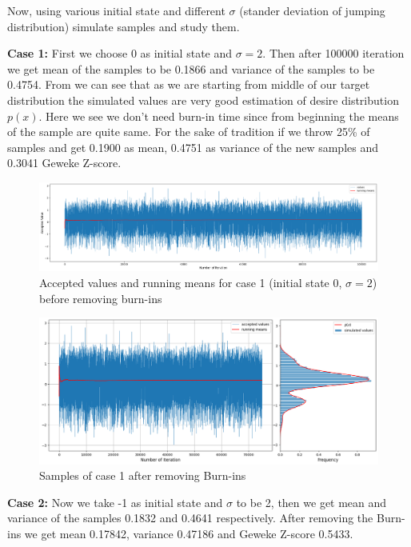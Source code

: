 \begin{example}
	Now, using various initial state and different $ \sigma $ (stander deviation of jumping distribution) simulate samples and study them.

	\textbf{Case 1:} First we choose $ 0 $ as initial state and $ \sigma = 2 $. Then after 100000 iteration we get mean of the samples to be 0.1866 and variance of the samples to be 0.4754.
	From  we can see that as we are starting from middle of our target distribution the simulated values are very good estimation of desire distribution $ p(x) $. Here we see we don't need burn-in time since from beginning the means of the sample are quite same. For the sake of tradition if we throw 25\% of samples and get 0.1900 as mean, 0.4751 as variance of the new samples and 0.3041 Geweke Z-score.

	\begin{figure}[H]
		\centering
		\includegraphics[width=1\textwidth]{./images/metropolis/example1/sample-1-values.png}
		\caption{Accepted values and running means for case 1 (initial state 0, $ \sigma = 2 $) before removing burn-ins}
		\label{fig:MH sample 1 values}
	\end{figure}

	\begin{figure}[H]
		\centering
		\includegraphics[width=1\textwidth]{./images/metropolis/example1/sample-1-value-hist-bo.png}
		\caption{Samples of case 1 after removing Burn-ins}
		\label{fig:MH sample 1 after burn-in}
	\end{figure}

	\textbf{Case 2:}  Now we take -1 as initial state and $ \sigma $ to be 2, then we get mean and variance of the samples 0.1832 and 0.4641 respectively. After removing the Burn-ins we get mean 0.17842, variance 0.47186 and Geweke Z-score 0.5433.


\end{example}

